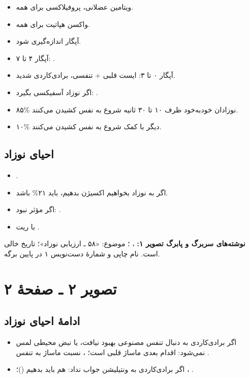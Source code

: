 \documentclass[12pt,a4paper]{article}
\begin{document}
\begin{itemize}
  \item ویتامین  عضلانی، پروفیلاکسی برای همه.
  \item واکسن هپاتیت  برای همه.
  \item آپگار  اندازه‌گیری شود.
  \item آپگار ۴ تا ۷: .
  \item آپگار ۰ تا ۳: ایست قلبی + تنفسی، برادی‌کاردی شدید.
  \item اگر نوزاد آسفیکسی بگیرد:
        .
  \item ۸۵\% نوزادان خودبه‌خود ظرف ۱۰ تا ۳۰ ثانیه شروع به نفس کشیدن می‌کنند.
  \item ۱۰\% دیگر با کمک شروع به نفس کشیدن می‌کنند.
\end{itemize}

\subsection*{احیای نوزاد}
\begin{itemize}
  \item {}.
  \item اگر به نوزاد بخواهیم اکسیژن بدهیم، باید ۲۱\% باشد.
  \item اگر مؤثر نبود: .
  \item با ریت .
\end{itemize}

\begingroup\footnotesize
\textbf{نوشته‌های سربرگ و پابرگ تصویر ۱:}
، ؛ موضوع: «۵۸ ـ ارزیابی نوزاد»؛ تاریخ خالی است.
نام چاپی  و شمارهٔ دست‌نویس ۱ در پایین برگه.
\par\endgroup

\clearpage
\section*{تصویر ۲ ـ صفحهٔ ۲}
\subsection*{ادامهٔ احیای نوزاد}
\begin{itemize}
  \item اگر برادی‌کاردی به دنبال تنفس مصنوعی بهبود نیافت، یا نبض محیطی لمس نمی‌شود:
        اقدام بعدی ماساژ قلبی است؛ ،
        نسبت ماساژ به تنفس .
  \item اگر برادی‌کاردی به ونتیلیشن جواب نداد:
         هم باید بدهیم ()؛
        ، .
\end{itemize}
\end{document}
